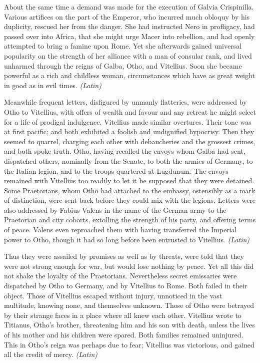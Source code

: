
About the same time a demand was made for the execution of Galvia Crispinilla. Various artifices on the part of the Emperor, who incurred much obloquy by his duplicity, rescued her from the danger. She had instructed Nero in profligacy, had passed over into Africa, that she might urge Macer into rebellion, and had openly attempted to bring a famine upon Rome. Yet she afterwards gained universal popularity on the strength of her alliance with a man of consular rank, and lived unharmed through the reigns of Galba, Otho, and Vitellius. Soon she became powerful as a rich and childless woman, circumstances which have as great weight in good as in evil times. \emph{(Latin)}


Meanwhile frequent letters, disfigured by unmanly flatteries, were addressed by Otho to Vitellius, with offers of wealth and favour and any retreat he might select for a life of prodigal indulgence. Vitellius made similar overtures. Their tone was at first pacific; and both exhibited a foolish and undignified hypocrisy. Then they seemed to quarrel, charging each other with debaucheries and the grossest crimes, and both spoke truth. Otho, having recalled the envoys whom Galba had sent, dispatched others, nominally from the Senate, to both the armies of Germany, to the Italian legion, and to the troops quartered at Lugdunum. The envoys remained with Vitellius too readily to let it be supposed that they were detained. Some Praetorians, whom Otho had attached to the embassy, ostensibly as a mark of distinction, were sent back before they could mix with the legions. Letters were also addressed by Fabius Valens in the name of the German army to the Praetorian and city cohorts, extolling the strength of his party, and offering terms of peace. Valens even reproached them with having transferred the Imperial power to Otho, though it had so long before been entrusted to Vitellius. \emph{(Latin)}


Thus they were assailed by promises as well as by threats, were told that they were not strong enough for war, but would lose nothing by peace. Yet all this did not shake the loyalty of the Praetorians. Nevertheless secret emissaries were dispatched by Otho to Germany, and by Vitellius to Rome. Both failed in their object. Those of Vitellius escaped without injury, unnoticed in the vast multitude, knowing none, and themselves unknown. Those of Otho were betrayed by their strange faces in a place where all knew each other. Vitellius wrote to Titianus, Otho's brother, threatening him and his son with death, unless the lives of his mother and his children were spared. Both families remained uninjured. This in Otho's reign was perhaps due to fear; Vitellius was victorious, and gained all the credit of mercy. \emph{(Latin)}

